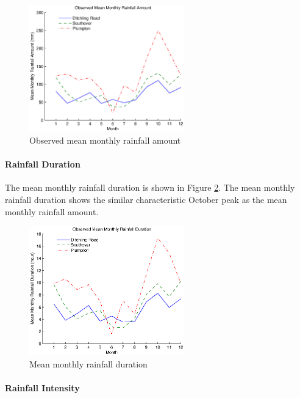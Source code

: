 \begin{figure}[htbp]
  \centering
  \includegraphics[width=0.60\textwidth]{./img/obs_mean_monthly_amount}
  \caption[Observed mean monthly rainfall amount]{Observed mean monthly
rainfall amount}
  \label{fig:obs_mean_monthly_amount}
\end{figure}

\paragraph{Rainfall Duration}
\label{sec:RainfallDuration}

The mean monthly rainfall duration is shown in Figure
\ref{fig:obs_mean_monthly_duration}. The mean monthly rainfall duration shows
the similar characteristic October peak as the mean monthly rainfall amount.

\begin{figure}[htbp]
  \centering
  \includegraphics[width=0.60\textwidth]{./img/obs_mean_monthly_duration}
  \caption{Mean monthly rainfall duration}
  \label{fig:obs_mean_monthly_duration}
\end{figure}

\paragraph{Rainfall Intensity}
\label{sec:ResultsRainfallIntensity}

